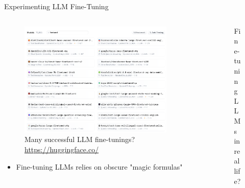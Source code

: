 \documentclass[11pt,aspectratio=169]{beamer}
\begin{document}
\begin{frame}{Experimenting LLM Fine-Tuning}
    \begin{columns}
        \renewcommand{\thempfootnote}{}
        \begin{column}{0.5\linewidth}
            \vspace{-0.5cm}
            \begin{figure}
                \centering
                \caption*{\centering Many successful LLM fine-tunings?\\{\footnotesize\url{https://huggingface.co/}}}
                \vspace{-0.3cm}
                \includegraphics[width=0.9\textwidth]{finetune_success.png}
            \end{figure}
            \vspace{-0.3cm}
            \begin{itemize}
                \item {\color{red}} Fine-tuning LLMs relies on obscure "magic formulas"
            \end{itemize}
        \end{column}
        \begin{column}{0.5\linewidth}
            \vspace{-0.8cm}
            \begin{figure}
                \centering
                \caption*{\centering Fine-tuning LLMs in real life?}

\end{figure}
\end{column}
\end{columns}
\end{frame}
\end{document}
